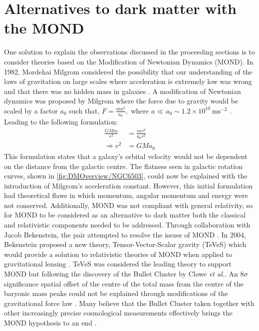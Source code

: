 \section{Alternatives to dark matter with the MOND}\label{sec:DMOverview/MOND}
One solution to explain the observations discussed in the proceeding sections is to consider theories based on the Modification of Newtonian Dynamics (MOND). In 1982, Mordehai Milgrom considered the possibility that our understanding of the laws of gravitation on large scales where acceleration is extremely low was wrong and that there was no hidden mass in galaxies \cite{MOND}. A modification of Newtonian dynamics was proposed by Milgrom where the force due to gravity would be scaled by a factor $a_0$ such that, $F=\frac{ma^2}{a_0},$ where $a\ll a_0\sim 1.2\times10^{10}~\text{ms}^{-2}$ \cite{HistoryofDM}. Leading to the following formulation:
\begin{equation}
\begin{split}
    \frac{GMm}{r^2}&=\frac{mv^2}{a_0r^2}\\
    \Rightarrow v^2&=GMa_0
\end{split}
\end{equation}
This formulation states that a galaxy's orbital velocity would not be dependent on the distance from the galactic centre. The flatness seen in galactic rotation curves, shown in \autoref{fig:DMOverview/NGC6503}, could now be explained with the introduction of Milgrom's acceleration constant. However, this initial formulation had theoretical flaws in which momentum, angular momentum and energy were not conserved. Additionally, MOND was not compliant with general relativity, so for MOND to be considered as an alternative to dark matter both the classical and relativistic components needed to be addressed.
Through collaboration with Jacob Bekenstein, the pair attempted to resolve the issues of MOND \cite{Bekenstein1984}. In 2004, Bekenstein proposed a new theory, Tensor-Vector-Scalar
gravity (TeVeS) which would provide a solution to relativistic theories of MOND when applied to gravitational lensing \cite{TeVeS}. TeVeS was considered the leading theory to support MOND but following the discovery of the Bullet Cluster by Clowe \textit{et al.}. 
An $8\sigma$ significance spatial offset of the centre of the total mass from the centre of the baryonic mass peaks could not be explained through modifications of the gravitational force law \cite{Clowe2006}. Many believe that the Bullet Cluster taken together with other increasingly precise cosmological measurements effectively brings the MOND hypothesis to an end \cite{HistoryofDM}. 


